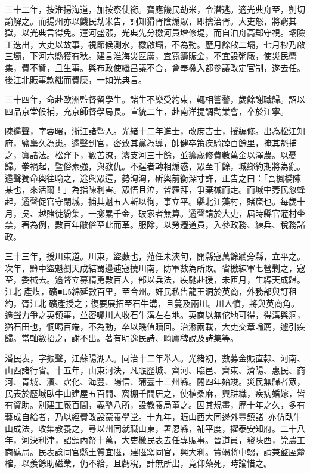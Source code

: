 \begin{pinyinscope}
三十二年，按淮揚海道，加按察使銜。寶應饑民劫米，令潛逃。適光典舟至，剴切諭解之。而揚州亦以饑民劫米告，詗知猾胥陰煽眾，即擒治胥。大吏怒，將窮其獄，以光典言得免。運河盛漲，光典先分檄河員增修堤，而自泊舟高郵守視。壩險工迭出，大吏以故事，視節候測水，檄啟壩，不為動。歷月餘啟二壩，七月杪乃啟三壩，下河六縣獲有秋。建言淮海災區廣，宜寬籌賑金，不宜設粥廠，使災民麕集，費不貲，且生事。與布政使繼昌議不合，會奉檄入都參議改定官制，遂去任。後江北賑事款絀而費糜，一如光典言。

三十四年，命赴歐洲監督留學生。諸生不樂受約束，輒相訾謷，歲餘謝職歸。詔以四品京堂候補，充京師督學局長。宣統二年，赴南洋提調勸業會，卒於江寧。

陳遹聲，字蓉曙，浙江諸暨人。光緒十二年進士，改庶吉士，授編修。出為松江知府，鹽梟久為患。遹聲到官，密致其黨為導，帥健卒策疾騎踔百餘里，掩其魁捕之，寘諸法。松窪下，數苦潦，濬支河三十餘，並籌歲修費數萬金以澤農。以憂歸。拳禍起，暨俗素強，與教仇。不逞者轉相煽惑，眾至千餘，城鄉約期將為亂。遹聲獨命輿往喻之，途與眾遌，勢洶洶，斫輿前衡深寸許，正告之曰：「吾楓橋陳某也，來活爾！」為指陳利害。眾悟且泣，皆羅拜，爭棄械而走。而城中莠民忽蜂起，遹聲促官守閉城，捕其魁五人斬以徇，事立平。縣北江藻村，賭窟也。每歲十月，吳、越賭徒紛集，一擲累千金，破家者無算。遹聲請於大吏，屆時縣官蒞村坐禁，著為例，數百年敝俗至此而革。服除，以勞遷道員，入參政務、練兵、稅務諸政。

三十三年，授川東道。川東，盜藪也，蒞任未浹旬，開縣寇萬餘躪旁縣，立平之。次年，黔中盜魁劉天成結蜀邊逋寇撓川南，防軍數為所敗。省檄練軍七營剿之，寇至，委械去。遹聲立募精勇數百人，部以兵法，疾馳赴援，未匝月，生縛天成歸。江北產煤，礦■L5綿延數百里，至合州。奸民私售龍王洞於英商，外務部與訂租約，胥江北礦產授之；復要展拓至石牛溝，且蔓及兩川。川人憤，將與英商角。遹聲力爭之英領事，並密囑川人收石牛溝左右地。英商以無佗地可得，得溝與洞，猶石田也，恫喝百端，不為動，卒以賤值贖回。治渝兩載，大吏交章論薦，遽引疾歸。當軸數招之，謝不出。著有明逸民詩、畸廬稗說及詩集等。

潘民表，字振聲，江蘇陽湖人。同治十二年舉人。光緒初，數募金賑直隸、河南、山西諸行省。十五年，山東河決，凡賑歷城、齊河、臨邑、齊東、濟陽、惠民、商河、青城、濱、霑化、海豐、陽信、蒲臺十三州縣。閱四年始竣。災民無歸者眾，民表於歷城臥牛山建屋五百間、窩棚千間居之，使植桑麻，興耕織，疾病婚嫁，皆有資助。別建工廠百間，義塾八所，設教養局董之。因其規畫，歷十年之久，多有藝成自給者，乃以經費改設蒙養學堂。十九年，賑山西大同邊外豐鎮諸，亦仿臥牛山成法，收集教養之，尋以州同就職山東，署恩縣，補平度，擢泰安知府。二十八年，河決利津，詔頒內帑十萬，大吏檄民表去任專賑事。晉道員，發陜西，筦農工商礦局。民表諗同官縣土質宜磁，建磁窯同官，興大利。貲竭將中輟，請兼盩厔釐榷，以羨餘助磁業，仍不給，且虧稅，計無所出，竟仰藥死，時論惜之。


\end{pinyinscope}
